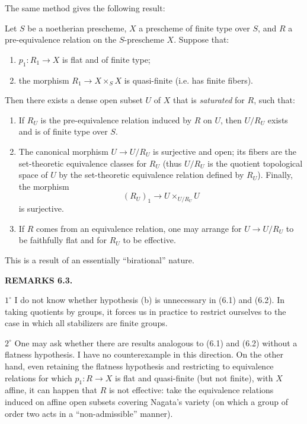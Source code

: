 The same method gives the following result:

 Let $S$ be a noetherian prescheme, $X$ a prescheme of
finite type over $S$, and $R$ a pre-equivalence relation on the $S$-prescheme
$X$. Suppose that:
\begin{enumerate}
\item[(a)] $p_1:R_1\to X$ is flat and of finite type;
\item[(b)] the morphism $R_1\to X\times_S X$ is quasi-finite (i.e. has finite
fibers).
\end{enumerate}
Then there exists a dense open subset $U$ of $X$ that is \emph{saturated} for
$R$, such that:
\begin{enumerate}
\item[(i)] If $R_U$ is the pre-equivalence relation induced by $R$ on $U$,
then $U/R_U$ exists and is of finite type over $S$.

\item[(ii)] The canonical morphism $U\to U/R_U$ is surjective and open; its
fibers are the set-theoretic equivalence classes for $R_U$ (thus $U/R_U$ is
the quotient topological space of $U$ by the set-theoretic equivalence
relation defined by $R_U$). Finally, the morphism
\[
  (R_U)_1\longrightarrow U\times_{U/R_U}U
\]
is surjective.

\item[(iii)] If $R$ comes from an equivalence relation, one may arrange for
$U\to U/R_U$ to be faithfully flat and for $R_U$ to be effective.
\end{enumerate}

This is a result of an essentially ``birational'' nature.

\medskip
\noindent\textbf{REMARKS 6.3.}

\smallskip
\noindent $1^\circ$ I do not know whether hypothesis (b) is unnecessary in
(6.1) and (6.2). In taking quotients by groups, it forces us in practice to
restrict ourselves to the case in which all stabilizers are finite groups.

\smallskip
\noindent $2^\circ$ One may ask whether there are results analogous to (6.1)
and (6.2) without a flatness hypothesis. I have no counterexample in this
direction. On the other hand, even retaining the flatness hypothesis and
restricting to equivalence relations for which $p_1:R\to X$ is flat and
quasi-finite (but not finite), with $X$ affine, it can happen that $R$ is not
effective: take the equivalence relations induced on affine open subsets
covering Nagata's variety (on which a group of order two acts in a
``non-admissible'' manner).

